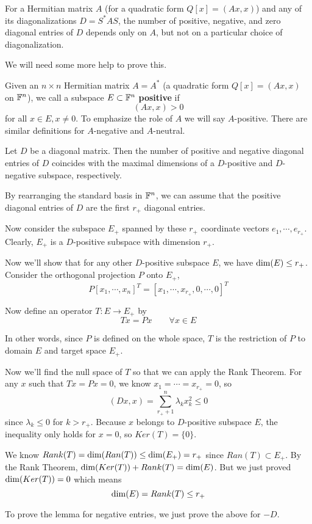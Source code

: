 \begin{theorem}
For a Hermitian matrix $A$ (for a quadratic form $Q[x] = (Ax, x)$) and any of its diagonalizations $D = S^{*} AS$, the number of positive, negative, and zero diagonal entries of $D$ depends only on $A$, but not on a particular choice of diagonalization. 
\end{theorem}

We will need some more help to prove this. 

\begin{definition}
Given an $n \times n$ Hermitian matrix $A = A^{*}$ (a quadratic form $Q[x] = (Ax, x)$ on $\mathbb{F}^{n}$), we call a subspace $E \subset \mathbb{F}^{n}$ \textbf{positive} if 
$$(Ax, x) > 0$$ 
for all $x \in E, x \neq 0$. To emphasize the role of $A$ we will say $A$-positive. There are similar definitions for $A$-negative and $A$-neutral. 
\end{definition}

\begin{lemma}
Let $D$ be a diagonal matrix. Then the number of positive and negative diagonal entries of $D$ coincides with the maximal dimensions of a $D$-positive and $D$-negative subspace, respectively. 
\end{lemma}

\begin{lproof}
By rearranging the standard basis in $\mathbb{F}^{n}$, we can assume that the positive diagonal entries of $D$ are the first $r_{+}$ diagonal entries. 

Now consider the subspace $E_{+}$ spanned by these $r_{+}$ coordinate vectors $e_{1}, \cdots, e_{r_{+}}$. Clearly, $E_{+}$ is a $D$-positive subspace with dimension $r_{+}$. 

Now we'll show that for any other $D$-positive subspace $E$, we have $\operatorname{dim}(E) \leq r_{+}$. Consider the orthogonal projection $P$ onto $E_{+}$, 
$$P[x_{1}, \cdots, x_{n}]^{T} = [x_{1}, \cdots, x_{r_{+}}, 0, \cdots, 0]^{T}$$

Now define an operator $T: E \rightarrow E_{+}$ by 
$$Tx = Px \qquad \forall x \in E$$

In other words, since $P$ is defined on the whole space, $T$ is the restriction of $P$ to domain $E$ and target space $E_{+}$. 

Now we'll find the null space of $T$ so that we can apply the Rank Theorem. For any $x$ such that $Tx = Px = 0$, we know $x_{1} = \cdots = x_{r_{+}} = 0$, so 
$$(Dx, x) = \sum_{r_{+} + 1}^{n} \lambda_{k} x_{k}^{2} \leq 0$$
since $\lambda_{k} \leq 0$ for $k > r_{+}$. Because $x$ belongs to $D$-positive subspace $E$, the inequality only holds for $x = 0$, so $Ker(T) = \{0\}$. 

We know $Rank(T) = \operatorname{dim}(Ran(T)) \leq \operatorname{dim}(E_{+}) = r_{+}$ since $Ran(T) \subset	E_{+}$. By the Rank Theorem, $\operatorname{dim}(Ker(T)) + Rank(T) = \operatorname{dim}(E)$. But we just proved $\operatorname{dim}(Ker(T)) = 0$ which means 
$$\operatorname{dim}(E) = Rank(T) \leq r_{+}$$

To prove the lemma for negative entries, we just prove the above for $-D$. 
\end{lproof}

